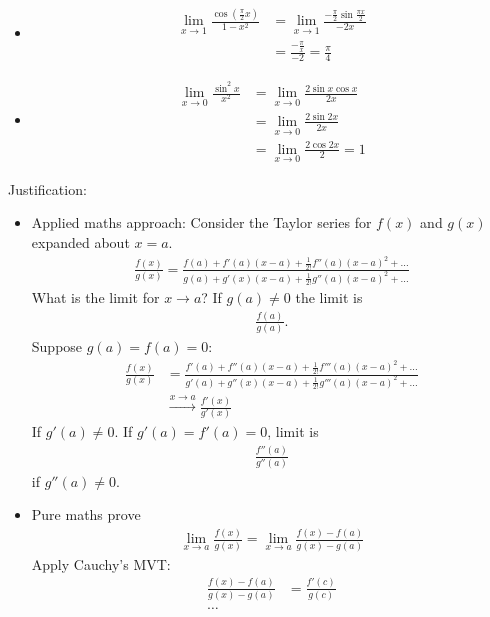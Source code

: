 \begin{ex}
	\begin{itemize}
		\item
		\begin{align*}
		\lim_{x \to 1} \frac{\cos(\frac \pi 2 x)}{1-x^2} & = \lim_{x \to 1} \frac{- \frac \pi 2 \sin\frac{\pi x} 2}{-2x} \\
		& = \frac{- \frac \pi x}{-2} = \frac \pi 4
		\end{align*}
		\item
		\begin{align*}
		\lim_{x \to 0} \frac{\sin^2 x}{x^2} & = \lim_{x\to 0} \frac{2 \sin x \cos x}{2x} \\
		& = \lim_{x \to 0} \frac{2 \sin 2x}{2x} \\
		& = \lim_{x \to 0} \frac{2 \cos 2x}{2} = 1
		\end{align*}
	\end{itemize}
\end{ex}

Justification:
\begin{itemize}
	\item
	Applied maths approach:
	Consider the Taylor series for $f(x)$ and $g(x)$ expanded about $x=a$.
	\begin{align*}
	\frac{f(x)}{g(x)} = \frac{f(a) + f'(a) (x-a) + \frac 1 {2!} f''(a) (x-a)^2 + \dots}{g(a) +g'(x)(x-a) + \frac 1 {2!}  g''(a) (x-a)^2+ \dots}
	\end{align*}
	What is the limit for $x \to a$? If $g(a) \neq 0$ the limit is
	\begin{align*}
	\frac{f(a)}{g(a)}.
	\end{align*}
	Suppose $g(a) = f(a) = 0$:
	\begin{align*}
	\frac{f(x)}{g(x)} & = \frac{f'(a) + f''(a) (x-a) + \frac 1 {2!} f'''(a) (x-a)^2 + \dots}{g'(a) +g''(x)(x-a) + \frac 1 {2!}  g'''(a) (x-a)^2+ \dots} \\
	& \overset{x \to a}{\to} \frac{f'(x)}{g'(x)}
	\end{align*}
	If $g'(a) \neq 0$. If $g'(a) = f'(a) = 0$, limit is
	\begin{align*}
	\frac{f''(a)}{g''(a)}
	\end{align*}
	if $g''(a) \neq 0$.
	\item
	Pure maths prove
	\begin{align*}
	\lim_{x \to a} \frac{f(x)}{g(x)} = \lim_{x \to a} \frac{f(x) - f(a)}{g(x)-g(a)}
	\end{align*}
	Apply Cauchy's MVT:
	\begin{align*}
	\frac{f(x) - f(a)}{g(x)-g(a)} & = \frac{f'(c)}{g(c)} \\
	\dots& 
	\end{align*}
\end{itemize}









